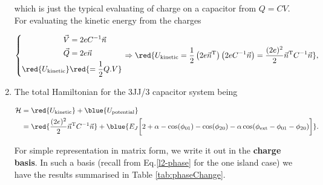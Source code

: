 \begin{enumerate}
  \noindent  which  is just  the  typical  evaluating  of charge  on  a
  capacitor from  $ Q = CV  $.  For evaluating the  kinetic energy from
  the charges

  \begin{equation}
    \left\lbrace \begin{aligned}
        \vec{V} & = 2eC^{-1}\vec{n}\\
        \vec{Q} & = 2e\vec{n}\\
        \red{U_{\text{kinetic}}} & \red{= \frac{1}{2}Q.V}\\
      \end{aligned}\right.  \Rightarrow \red{U_{\text{kinetic}} =
      \frac{1}{2}\left(2e\vec{n}^{\text{T}}\right)\left(2eC^{-1}\vec{n}\right)               =
      \frac{(2e)^2}{2}\vec{n}^{\text{T}}C^{-1}\vec{n}},
  \end{equation}


\item The total Hamiltonian for the 3JJ/3 capacitor system being

  \begin{equation}
    \label{eqn:l23JJ}
    \begin{aligned}
      \mathcal{H}       &       =      \red{U_{\text{kinetic}}}       +
      \blue{U_{\text{potential}}}\\                 &                 =
      \red{\frac{(2e)^2}{2}\vec{n}^{\text{T}}C^{-1}\vec{n}}           +
      \blue{E_J\bigg[2+\alpha  -  \cos(\phi_{01}) -  \cos(\phi_{20})  -
        \alpha\cos(\phi_\text{ext}-\phi_{01} - \phi_{20})\bigg]}.
    \end{aligned}
  \end{equation}

  For simple  representation in  matrix form,  we write  it out  in the
  \textbf{charge   basis}.     In   such    a   basis    (recall   from
  Eq.\eqref{l2-phase}  for the  one island  case) we  have the  results
  summarised in Table \ref{tab:phaseChange}.


\end{enumerate}
